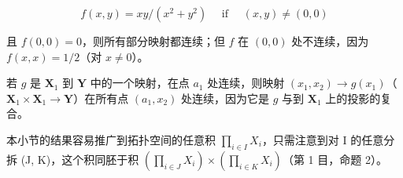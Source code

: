 \[
f (x, y) = x y / \left(x ^ {2} + y ^ {2}\right) \quad \text { if } \quad (x, y) \neq (0, 0)
\]

且 \(f(0, 0) = 0\)，则所有部分映射都连续；但 \(f\) 在 \((0, 0)\) 处不连续，因为 \(f(x, x) = 1/2\)（对 \(x \neq 0\)）。

若 \(g\) 是 \(\mathbf{X}_1\) 到 \(\mathbf{Y}\) 中的一个映射，在点 \(a_1\) 处连续，则映射 \((x_1, x_2) \to g(x_1)\)（\(\mathbf{X}_1 \times \mathbf{X}_1 \to \mathbf{Y}\)）在所有点 \((a_1, x_2)\) 处连续，因为它是 \(g\) 与到 \(\mathbf{X}_1\) 上的投影的复合。

本小节的结果容易推广到拓扑空间的任意积 \(\prod_{i\in I}X_i\)，只需注意到对 I 的任意分拆 (J, K)，这个积同胚于积 \(\left(\prod_{i\in J}X_i\right)\times\left(\prod_{i\in K}X_i\right)\)（第 1 目，命题 2）。

